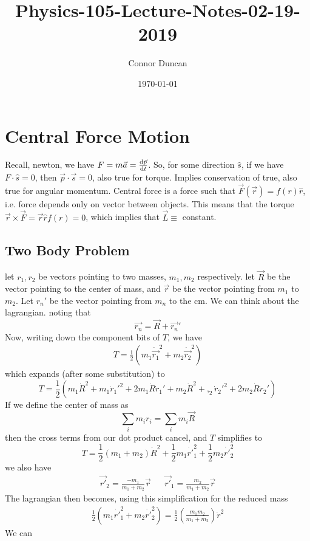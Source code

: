 \documentclass{article} \usepackage{amsmath} \usepackage{amssymb} \usepackage{amsthm} \usepackage[margin=0.2in]{geometry} \usepackage{hyperref} \usepackage{physics} \usepackage{tikz} \usepackage{mathtools} \mathtoolsset{showonlyrefs} \theoremstyle{definition} \newtheorem{theorem}{Theorem}[section] \newtheorem{corollary}{Corollary}[theorem] \newtheorem{lemma}[theorem]{Lemma} \newtheorem{definition}{Definition}[section] \author{Connor Duncan} \date{\today}
\title{Physics-105-Lecture-Notes-02-19-2019}
\begin{document}
\maketitle\tableofcontents
\noindent{}
\section{Central Force Motion} Recall, newton, we have $F=m\vec{a}=\dv{\vec{p}}{t}$. So, for some direction $\hat s$, if we have $F\cdot\hat s=0$, then $\vec{p}\cdot\vec{s}=0$, also true for torque. Implies conservation of true, also true for angular momentum.  Central force is a force such that $\vec{F}(\vec{r})=f(r)\hat r$, i.e. force depends only on vector between objects. This means that the torque $\vec r \times \vec F=\vec r \hat rf(r)=0$, which implies that $\vec L\equiv$ constant. \subsection{Two Body Problem} let $r_1,r_2$ be vectors pointing to two masses, $m_1,m_2$ respectively. let $\vec R$ be the vector pointing to the center of mass, and $\vec r$ be the vector pointing from $m_1$ to $m_2$. Let $r_n'$ be the vector pointing from $m_n$ to the cm. We can think about the lagrangian. noting that \begin{equation} \vec{r_n}=\vec{R}+\vec{r_n}' \end{equation} Now, writing down the component bits of $T$, we have \begin{align} T=\frac{1}{2}(m_1\dot{\vec{r_1}}^2+m_2\dot{\vec{r_2}}^2) \end{align} which expands (after some substitution) to \begin{equation} T=\frac{1}{2}\left(m_1\dot{R}^2+m_1\dot{r}_1'^2+2m_1\dot{R}\dot{r}_1'+m_2\dot{R}^2+,_2\dot{r}_2'^2+2m_2\dot{R}\dot{r}_2'\right) \end{equation} If we define the center of mass as \begin{equation} \sum_i m_ir_i=\sum_im_i\vec{R} \end{equation} then the cross terms from our dot product cancel, and $T$ simplifies to \begin{equation} T=\frac{1}{2}(m_1+m_2)\dot{R}^2+\frac{1}{2}m_1\dot{r'}_1^2+\frac{1}{2}m_2\dot{r'}_2^2 \end{equation} we also have \begin{align} \vec{r'}_2=\frac{-m_1}{m_1+m_2}\vec{r} && \vec{r'}_1=\frac{m_2}{m_1+m_2}\vec{r} \end{align} The lagrangian then becomes, using this simplification for the reduced mass \begin{align} \frac{1}{2}(m_1\dot{r'}_1^2+m_2\dot{r'}_2^2)=\frac{1}{2}\left(\frac{m_1m_2}{m_1+m_2}\right)\dot{r}^2 \end{align} We can 
\end{document}
